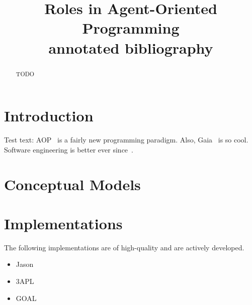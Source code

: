 \documentclass{article}
\title{Roles in Agent-Oriented Programming\\[1ex]\small{annotated bibliography}}
\begin{document}
\maketitle

\begin{abstract}
TODO
\end{abstract}

\section{Introduction}

Test text:
AOP~\cite{journals/ai/Shoham93} is a fairly new programming paradigm.
Also, Gaia~\cite{journals/aamas/WooldridgeJK00} is so cool.
Software engineering is better ever since~\cite{conf/aose/WooldridgeC00}.

\section{Conceptual Models}

\section{Implementations}

The following implementations are of high-quality and are actively developed.
\begin{itemize}
\item Jason~\cite{books/sp/map2005/BordiniHV05}
\item 3APL~\cite{books/sp/map2005/DastaniRM05}
\item GOAL~\cite{hindriks2009programmingrationalagents}
\end{itemize}



\end{document}
